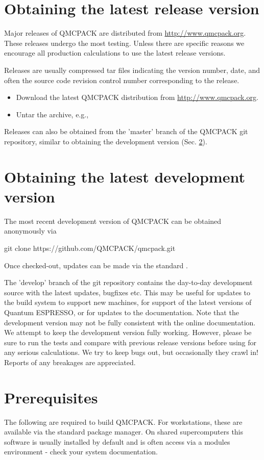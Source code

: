 \section{Obtaining the latest release version}
\label{sec:obrelease}
Major releases of QMCPACK are distributed from
\url{http://www.qmcpack.org}. These releases undergo the most testing. Unless there are
specific reasons we encourage all production calculations to use the
latest release versions.

Releases are usually compressed tar files indicating the version
number, date, and often the source code revision control number
corresponding to the release.

\begin{itemize}
\item Download the latest QMCPACK distribution from \url{http://www.qmcpack.org}.
\item Untar the archive, e.g., 
\end{itemize}

Releases can also be obtained from the 'master' branch of the QMCPACK
git repository, similar to obtaining the development version (Sec. \ref{sec:obdevelopment}).

\section{Obtaining the latest development version}
\label{sec:obdevelopment}
The most recent development version of QMCPACK can be obtained anonymously via
\begin{shade}
git clone https://github.com/QMCPACK/qmcpack.git
\end{shade}
Once checked-out,
updates can be made via the standard .

The 'develop' branch of the git repository contains the day-to-day development source
with the latest updates, bugfixes etc. This may be useful
for updates to the build system to support new machines, for support
of the latest versions of Quantum ESPRESSO, or for updates to the
documentation.  Note that the development version may not be fully
consistent with the online documentation.  We attempt to keep
the development version fully working. However, please be sure to run the tests and
compare with previous release versions before using for any serious
calculations. We try to keep bugs out, but occasionally they crawl
in! Reports of any breakages are appreciated.

\section{Prerequisites}
\label{sec:prerequisites}
The following are required to build QMCPACK. For workstations, these are available via the standard
package manager. On shared supercomputers this software is usually
installed by default and is often
access via a modules environment - check your system
documentation.

